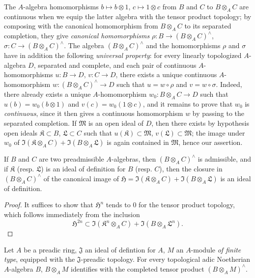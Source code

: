 \begin{env}[7.7.6]
\label{0.7.7.6}
The $A$-algebra homomorphisms $b\mapsto b\otimes 1$, $c\mapsto 1\otimes c$ from $B$ and $C$ to
$B\otimes_A C$ are continuous when we equip the latter algebra with the tensor product topology; by
composing with the canonical homomorphism from $B\otimes_A C$ to its separated completion, they
give \emph{canonical homomorphisms} $\rho:B\to(B\otimes_A C)^\wedge$,
$\sigma:C\to(B\otimes_A C)^\wedge$. The algebra $(B\otimes_A C)^\wedge$ and the homomorphisms
$\rho$ and $\sigma$ have in addition the following \emph{universal property}: for every linearly
topologized $A$-algebra $D$, separated and complete, and each pair of continuous $A$-homomorphisms
$u:B\to D$, $v:C\to D$, there exists a unique continuous $A$-homomorphism
$w:(B\otimes_A C)^\wedge\to D$ such that $u=w\circ\rho$ and $v=w\circ\sigma$. Indeed, there already
exists a unique $A$-homomorphism $w_0:B\otimes_A C\to D$ such that $u(b)=w_0(b\otimes 1)$ and
$v(c)=w_0(1\otimes c)$, and it remains to prove that $w_0$ is \emph{continuous}, since it then gives a
continuous homomorphism $w$ by passing to the separated completion. If $\mathfrak{M}$ is an open
ideal of $D$, then there exists by hypothesis open ideals $\mathfrak{K}\subset B$,
$\mathfrak{L}\subset C$ such that $u(\mathfrak{K})\subset\mathfrak{M}$,
$v(\mathfrak{L})\subset\mathfrak{M}$; the image under $w_0$ of
$\Im(\mathfrak{K}\otimes_A C)+\Im(B\otimes_A\mathfrak{L})$ is again contained in $\mathfrak{M}$,
hence our assertion.
\end{env}

\begin{proposition}[7.7.7]
\label{0.7.7.7}
If $B$ and $C$ are two preadmissible $A$-algebras, then $(B\otimes_A C)^\wedge$ is
admissible, and if $\mathfrak{K}$ (resp. $\mathfrak{L}$) is an ideal of definition for
$B$ (resp. $C$), then the closure in $(B\otimes_A C)^\wedge$ of the canonical image of
$\mathfrak{H}=\Im(\mathfrak{K}\otimes_A C)+\Im(B\otimes_A\mathfrak{L})$ is an ideal of definition.
\end{proposition}

\begin{proof}
It suffices to show that $\mathfrak{H}^n$ tends to $0$ for the tensor product topology, which follows immediately from the inclusion
\[
  \mathfrak{H}^{2n}\subset\Im(\mathfrak{K}^n\otimes_A C)+\Im(B\otimes_A\mathfrak{L}^n).
\]
\end{proof}

\begin{proposition}[7.7.8]
\label{0.7.7.8}
Let $A$ be a preadic ring, $\mathfrak{J}$ an ideal of defintion for $A$, $M$ an $A$-module
\emph{of finite type}, equipped with the $\mathfrak{J}$-preadic topology. For every topological
adic Noetherian $A$-algebra $B$, $B\otimes_A M$ identifies with the completed tensor product
$(B\otimes_A M)^\wedge$.
\end{proposition}

